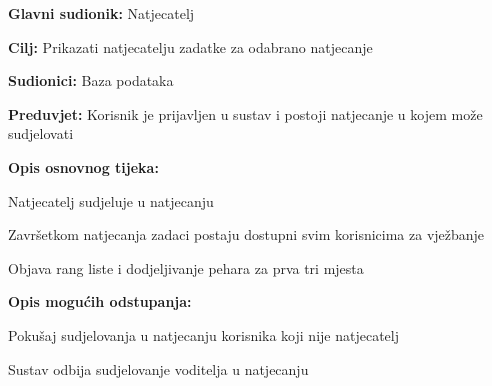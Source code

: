 					\noindent {}
					\begin{packed_item}
						
						\item \textbf{Glavni sudionik: }Natjecatelj
						\item  \textbf{Cilj:} Prikazati natjecatelju zadatke za odabrano natjecanje
						\item  \textbf{Sudionici:} Baza podataka
						\item  \textbf{Preduvjet:} Korisnik je prijavljen u sustav i postoji natjecanje u kojem može sudjelovati
						\item  \textbf{Opis osnovnog tijeka:}
						
						\item[] \begin{packed_enum}
							
							\item Natjecatelj sudjeluje u natjecanju
							\item Završetkom natjecanja zadaci postaju dostupni svim korisnicima za vježbanje
							\item Objava rang liste i dodjeljivanje pehara za prva tri mjesta
							
						\end{packed_enum}
						
						\item  \textbf{Opis mogućih odstupanja:}
						
						\item[] \begin{packed_item}
							
							\item[2.a] Pokušaj sudjelovanja u natjecanju korisnika koji nije natjecatelj
							\item[] \begin{packed_enum}
								
								\item Sustav odbija sudjelovanje voditelja u natjecanju 
								
							\end{packed_enum}
						\end{packed_item}
					\end{packed_item}
					
